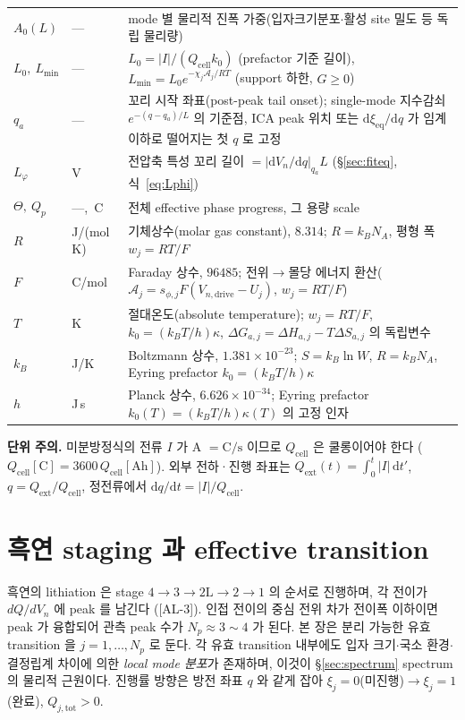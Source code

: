 \documentclass[11pt,a4paper]{article}
\newcommand{\dd}{\mathrm{d}}
\newcommand{\eq}{\mathrm{eq}}
\newcommand{\drive}{\mathrm{drive}}
\newcommand{\cell}{\mathrm{cell}}
\newcommand{\ext}{\mathrm{ext}}
\newcommand{\tot}{\mathrm{tot}}
\newcommand{\AL}[1]{\textsf{[AL-#1]}}
\begin{document}
\begin{longtable}{p{} p{} p{}}
$A_0(L)$ & --- & mode 별 물리적 진폭 가중(입자크기분포$\cdot$활성 site 밀도 등 독립 물리량) \\
$L_0,\ L_{\min}$ & --- & $L_0=|I|/(Q_\cell k_0)$ (prefactor 기준 길이), $L_{\min}=L_0 e^{-\chi_j\mathcal A_j/RT}$ (support 하한, $G\!\ge\!0$) \\
$q_a$ & --- & 꼬리 시작 좌표(post-peak tail onset); single-mode 지수감쇠 $e^{-(q-q_a)/L}$ 의 기준점, ICA peak 위치 또는 $\dd\xi_\eq/\dd q$ 가 임계 이하로 떨어지는 첫 $q$ 로 고정 \\
$L_\varphi$ & V & 전압축 특성 꼬리 길이 $=|\dd V_n/\dd q|_{q_a}L$ (\S\ref{sec:fiteq}, 식~\eqref{eq:Lphi}) \\
$\Theta,\ Q_p$ & ---,\ C & 전체 effective phase progress, 그 용량 scale \\
$R$ & J/(mol\,K) & 기체상수(molar gas constant), $8.314$; $R=k_B N_A$, 평형 폭 $w_j=RT/F$ \\
$F$ & C/mol & Faraday 상수, $96485$; 전위$\to$몰당 에너지 환산($\mathcal A_j=s_{\phi,j}F(V_{n,\drive}-U_j)$, $w_j=RT/F$) \\
$T$ & K & 절대온도(absolute temperature); $w_j=RT/F$, $k_0=(k_BT/h)\kappa$, $\Delta G_{a,j}=\Delta H_{a,j}-T\Delta S_{a,j}$ 의 독립변수 \\
$k_B$ & J/K & Boltzmann 상수, $1.381\times10^{-23}$; $S=k_B\ln W$, $R=k_B N_A$, Eyring prefactor $k_0=(k_BT/h)\kappa$ \\
$h$ & J\,s & Planck 상수, $6.626\times10^{-34}$; Eyring prefactor $k_0(T)=(k_BT/h)\kappa(T)$ 의 고정 인자 \\
\bottomrule
\end{longtable}
\textbf{단위 주의.} 미분방정식의 전류 $I$ 가 A $=\mathrm{C/s}$ 이므로 $Q_\cell$ 은 쿨롱이어야 한다
($Q_\cell[\mathrm C]=3600\,Q_\cell[\mathrm{Ah}]$). 외부 전하·진행 좌표는 $Q_\ext(t)=\int_0^t|I|\,\dd t'$,
$q=Q_\ext/Q_\cell$, 정전류에서 $\dd q/\dd t=|I|/Q_\cell$.

\section{흑연 staging 과 effective transition}\label{sec:staging}
흑연의 lithiation 은 stage $4\to3\to2\mathrm L\to2\to1$ 의 순서로 진행하며, 각 전이가 $dQ/dV_n$ 에 peak 를
남긴다 \cite{dahn1991,ohzuku1993,funabiki1999ea,funabiki1999jes}(\AL{3}). 인접 전이의 중심 전위 차가
전이폭 이하이면 peak 가 융합되어 관측 peak 수가 $N_p\approx3\sim4$ 가 된다. 본 장은 분리 가능한 유효
transition 을 $j=1,\dots,N_p$ 로 둔다. 각 유효 transition 내부에도 입자 크기$\cdot$국소 환경$\cdot$결정립계
차이에 의한 \emph{local mode 분포}가 존재하며, 이것이 \S\ref{sec:spectrum} spectrum 의 물리적 근원이다.
진행률 방향은 방전 좌표 $q$ 와 같게 잡아 $\xi_j=0$(미진행)$\to\xi_j=1$(완료), $Q_{j,\tot}>0$.
\end{document}
